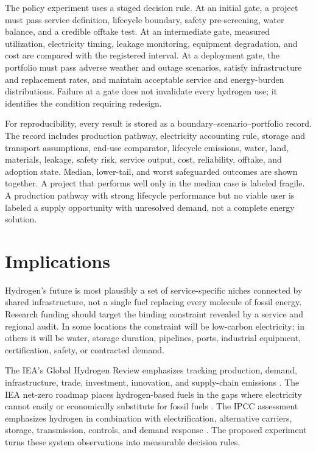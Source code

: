 \documentclass[conference]{IEEEtran}
\begin{document}
The policy experiment uses a staged decision rule. At an initial gate, a project must pass service definition, lifecycle boundary, safety pre-screening, water balance, and a credible offtake test. At an intermediate gate, measured utilization, electricity timing, leakage monitoring, equipment degradation, and cost are compared with the registered interval. At a deployment gate, the portfolio must pass adverse weather and outage scenarios, satisfy infrastructure and replacement rates, and maintain acceptable service and energy-burden distributions. Failure at a gate does not invalidate every hydrogen use; it identifies the condition requiring redesign.

For reproducibility, every result is stored as a boundary--scenario--portfolio record. The record includes production pathway, electricity accounting rule, storage and transport assumptions, end-use comparator, lifecycle emissions, water, land, materials, leakage, safety risk, service output, cost, reliability, offtake, and adoption state. Median, lower-tail, and worst safeguarded outcomes are shown together. A project that performs well only in the median case is labeled fragile. A production pathway with strong lifecycle performance but no viable user is labeled a supply opportunity with unresolved demand, not a complete energy solution.

\section{Implications}
\label{sec:implications}
Hydrogen's future is most plausibly a set of service-specific niches connected by shared infrastructure, not a single fuel replacing every molecule of fossil energy. Research funding should target the binding constraint revealed by a service and regional audit. In some locations the constraint will be low-carbon electricity; in others it will be water, storage duration, pipelines, ports, industrial equipment, certification, safety, or contracted demand.

The IEA's Global Hydrogen Review emphasizes tracking production, demand, infrastructure, trade, investment, innovation, and supply-chain emissions \cite{iea_review}. The IEA net-zero roadmap places hydrogen-based fuels in the gaps where electricity cannot easily or economically substitute for fossil fuels \cite{iea_nz}. The IPCC assessment emphasizes hydrogen in combination with electrification, alternative carriers, storage, transmission, controls, and demand response \cite{ipcc_wg3}. The proposed experiment turns these system observations into measurable decision rules.
\end{document}
